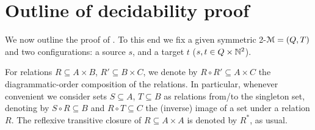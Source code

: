 



\section{Outline of decidability proof}\label{sec:outline}


We now outline the proof of .
To this end we
fix a given symmetric 2-\cm $\mathcal{M} = (Q,T)$ and 
two configurations: a source $s$, and a target $t$ ($s,t \in Q\times\mathbb{N}^2$).

For relations $R \subseteq A \times B$,
$R' \subseteq B \times C$, we denote by
$R \circ R' \subseteq A \times C$
the diagrammatic-order composition of the relations.
In particular, whenever convenient we consider sets
$S \subseteq A$, $T \subseteq B$ as
relations from/to the singleton set, denoting
by $S \circ R \subseteq B$ and $R \circ T \subseteq C$ the (inverse) image of a set
under a relation $R$.
The reflexive transitive closure of $R\subseteq A\times A$ 
is denoted by $R^*$, as usual.

